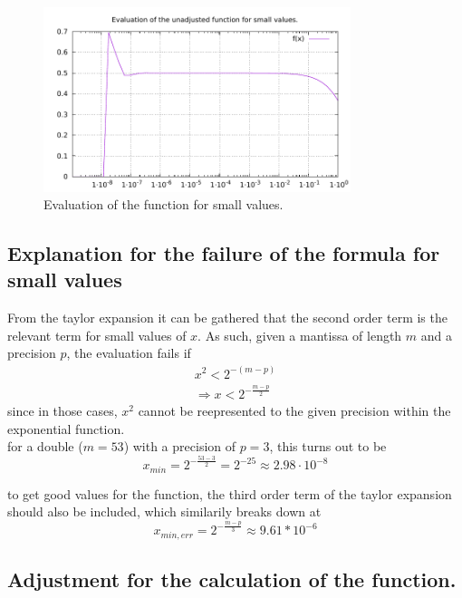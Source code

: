 \begin{figure}[t]
    \centering
    \includegraphics[width=0.8\textwidth]{../analysis/f.pdf}
    \caption{Evaluation of the function for small values.}
    \label{fig::f}
\end{figure}


\subsection{Explanation for the failure of the formula for small values}

From the taylor expansion it can be gathered that the second order term is the relevant term for small values of $x$. As such, given a mantissa of length $m$ and a precision $p$, the evaluation fails if
\begin{eqnarray}
    x^2 < 2^{-(m-p)}\\
    \Rightarrow x < 2^{-\frac{m-p}{2}}
\end{eqnarray}
since in those cases, $x^2$ cannot be reepresented to the given precision within the exponential function.\\
for a double ($m = 53$) with a precision of $p = 3$, this turns out to be
\begin{equation}
    x_{min} = 2^{-\frac{53 - 3}{2}} = 2^{-25} \approx 2.98\cdot 10^{-8}
\end{equation}

to get good values for the function, the third order term of the taylor expansion should also be included, which similarily breaks down at
\begin{equation}
    x_{min, err} = 2^{-\frac{m-p}{3}} \approx 9.61*10^{-6}
\end{equation}


\subsection{Adjustment for the calculation of the function.}

